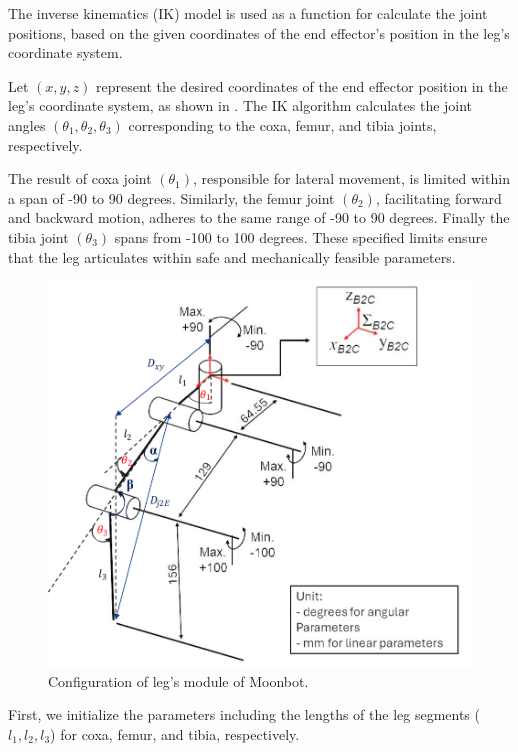 The inverse kinematics (IK) model is used as a function for calculate the joint positions, based on the given coordinates of the end effector's position in the leg's coordinate system.

Let $(x, y, z)$ represent the desired coordinates of the end effector position in the leg's coordinate system, as shown in . The IK algorithm calculates the joint angles $(\theta_1, \theta_2, \theta_3)$ corresponding to the coxa, femur, and tibia joints, respectively. 

The result of coxa joint $(\theta_1)$, responsible for lateral movement, is limited within a span of -90 to 90 degrees. Similarly, the femur joint $(\theta_2)$, facilitating forward and backward motion, adheres to the same range of -90 to 90 degrees. Finally the tibia joint $(\theta_3)$ spans from -100 to 100 degrees. These specified limits ensure that the leg articulates within safe and mechanically feasible parameters.

\begin{figure}[h]
  \centering
  \includegraphics[width=120mm]{./fig/leg_configuration/IK.pdf}
  \vspace{2mm}
  \caption{Configuration of leg's module of Moonbot.}\label{leg_config}
\end{figure}

First, we initialize the parameters including the lengths of the leg segments ($l_1, l_2, l_3$) for coxa, femur, and tibia, respectively.


